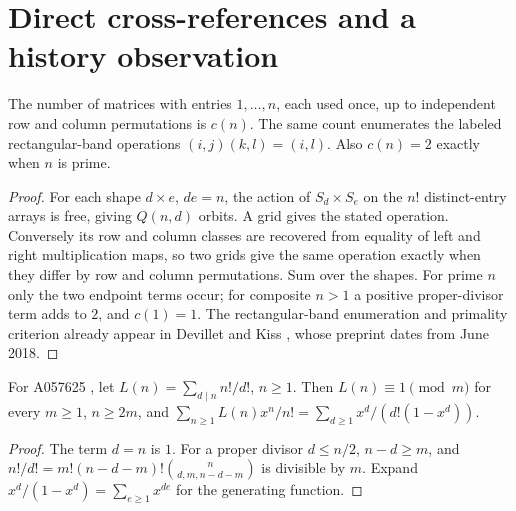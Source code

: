 \section{Direct cross-references and a history observation}
\begin{corollary}\label{cor:interpretations}
The number of matrices with entries $1,\ldots,n$, each used once,
up to independent row and column permutations is $c(n)$.
The same count enumerates the labeled rectangular-band operations
$(i,j)(k,l)=(i,l)$. Also $c(n)=2$ exactly when $n$ is prime.
\end{corollary}
\begin{proof}
For each shape $d\times e$, $de=n$, the action of $S_d\times S_e$
on the $n!$ distinct-entry arrays is free, giving $Q(n,d)$ orbits.
A grid gives the stated operation. Conversely its row and column classes
are recovered from equality of left and right multiplication maps,
so two grids give the same operation exactly when they differ by row
and column permutations. Sum over the shapes.
For prime $n$ only the two endpoint terms occur; for composite $n>1$
a positive proper-divisor term adds to $2$, and $c(1)=1$.
The rectangular-band enumeration and primality criterion already appear in
Devillet and Kiss \cite[Proposition 4.13 and Corollary 4.15]{dk},
whose preprint dates from June 2018.
\end{proof}

\begin{corollary}\label{cor:quet}
For A057625 \cite{a057625}, let $L(n)=\sum_{d\mid n}n!/d!$, $n\geq1$.
Then $L(n)\equiv1\pmod m$ for every $m\geq1$, $n\geq2m$, and
$\sum_{n\geq1}L(n)x^n/n!=\sum_{d\geq1}x^d/(d!(1-x^d))$.
\end{corollary}
\begin{proof}
The term $d=n$ is $1$. For a proper divisor $d\leq n/2$,
$n-d\geq m$, and
$n!/d!=m!(n-d-m)!\binom{n}{d,m,n-d-m}$ is divisible by $m$.
Expand $x^d/(1-x^d)=\sum_{e\geq1}x^{de}$ for the generating function.
\end{proof}

